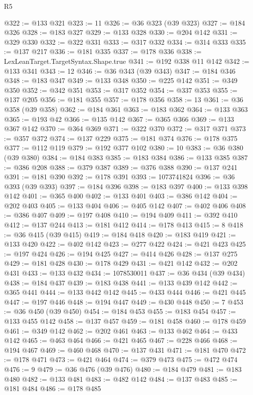 \begin{lexlean}{R5}
\begin{coremodule}
@322 := @133 @321
@323 := 11
@326 := @36 @323 (@39 @323)
@327 := @184 @326
@328 := @183 @327
@329 := @133 @328
@330 := @204 @142
@331 := @329 @330
@332 := @322 @331
@333 := @317 @332
@334 := @314 @333
@335 := @137 @217
@336 := @181 @335
@337 := @178 @336
@338 := LexLeanTarget.TargetSyntax.Shape.true
@341 := @192 @338 @11 @142
@342 := @133 @341
@343 := 12
@346 := @36 @343 (@39 @343)
@347 := @184 @346
@348 := @183 @347
@349 := @133 @348
@350 := @225 @142
@351 := @349 @350
@352 := @342 @351
@353 := @317 @352
@354 := @337 @353
@355 := @137 @205
@356 := @181 @355
@357 := @178 @356
@358 := 13
@361 := @36 @358 (@39 @358)
@362 := @184 @361
@363 := @183 @362
@364 := @133 @363
@365 := @193 @42
@366 := @135 @142
@367 := @365 @366
@369 := @133 @367 @142
@370 := @364 @369
@371 := @322 @370
@372 := @317 @371
@373 := @357 @372
@374 := @137 @229
@375 := @181 @374
@376 := @178 @375
@377 := @112 @119
@379 := @192 @377 @102
@380 := 10
@383 := @36 @380 (@39 @380)
@384 := @184 @383
@385 := @183 @384
@386 := @133 @385
@387 := @386 @208
@388 := @379 @387
@389 := @376 @388
@390 := @137 @241
@391 := @181 @390
@392 := @178 @391
@393 := 1073741824
@396 := @36 @393 (@39 @393)
@397 := @184 @396
@398 := @183 @397
@400 := @133 @398 @142
@401 := @365 @400
@402 := @133 @401
@403 := @386 @142
@404 := @202 @403
@405 := @133 @404
@406 := @405 @142
@407 := @402 @406
@408 := @386 @407
@409 := @197 @408
@410 := @194 @409
@411 := @392 @410
@412 := @137 @244
@413 := @181 @412
@414 := @178 @413
@415 := 8
@418 := @36 @415 (@39 @415)
@419 := @184 @418
@420 := @183 @419
@421 := @133 @420
@422 := @402 @142
@423 := @277 @422
@424 := @421 @423
@425 := @197 @424
@426 := @194 @425
@427 := @414 @426
@428 := @137 @275
@429 := @181 @428
@430 := @178 @429
@431 := @421 @142
@432 := @202 @431
@433 := @133 @432
@434 := 1078530011
@437 := @36 @434 (@39 @434)
@438 := @184 @437
@439 := @183 @438
@441 := @133 @439 @142
@442 := @365 @441
@444 := @133 @442 @142
@445 := @433 @444
@446 := @421 @445
@447 := @197 @446
@448 := @194 @447
@449 := @430 @448
@450 := 7
@453 := @36 @450 (@39 @450)
@454 := @184 @453
@455 := @183 @454
@457 := @133 @455 @142
@458 := @137 @457
@459 := @181 @458
@460 := @178 @459
@461 := @349 @142
@462 := @202 @461
@463 := @133 @462
@464 := @433 @142
@465 := @463 @464
@466 := @421 @465
@467 := @228 @466
@468 := @194 @467
@469 := @460 @468
@470 := @137 @431
@471 := @181 @470
@472 := @178 @471
@473 := @421 @464
@474 := @379 @473
@475 := @472 @474
@476 := 9
@479 := @36 @476 (@39 @476)
@480 := @184 @479
@481 := @183 @480
@482 := @133 @481
@483 := @482 @142
@484 := @137 @483
@485 := @181 @484
@486 := @178 @485

\end{coremodule}
\end{lexlean}
